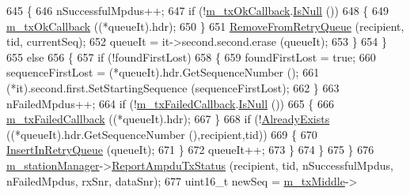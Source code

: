 \begin{DoxyCode}
645                         \{
646                           nSuccessfulMpdus++;
647                           \textcolor{keywordflow}{if} (!\hyperlink{classns3_1_1BlockAckManager_ace96f46b7c52c441becc70227b70d070}{m\_txOkCallback}.\hyperlink{classns3_1_1Callback_aa8e27826badbf37f84763f36f70d9b54}{IsNull} ())
648                             \{
649                               \hyperlink{classns3_1_1BlockAckManager_ace96f46b7c52c441becc70227b70d070}{m\_txOkCallback} ((*queueIt).hdr);
650                             \}
651                           \hyperlink{classns3_1_1BlockAckManager_aa7fc7ecdb5e0171b0e84bb39554f75e2}{RemoveFromRetryQueue} (recipient, tid, currentSeq);
652                           queueIt = it->second.second.erase (queueIt);
653                         \}
654                     \}
655                   \textcolor{keywordflow}{else}
656                     \{
657                       \textcolor{keywordflow}{if} (!foundFirstLost)
658                         \{
659                           foundFirstLost = \textcolor{keyword}{true};
660                           sequenceFirstLost = (*queueIt).hdr.GetSequenceNumber ();
661                           (*it).second.first.SetStartingSequence (sequenceFirstLost);
662                         \}
663                       nFailedMpdus++;
664                       \textcolor{keywordflow}{if} (!\hyperlink{classns3_1_1BlockAckManager_a58ccfd5da1b7e739b732699ddcc13530}{m\_txFailedCallback}.\hyperlink{classns3_1_1Callback_aa8e27826badbf37f84763f36f70d9b54}{IsNull} ())
665                         \{
666                           \hyperlink{classns3_1_1BlockAckManager_a58ccfd5da1b7e739b732699ddcc13530}{m\_txFailedCallback} ((*queueIt).hdr);
667                         \}
668                       \textcolor{keywordflow}{if} (!\hyperlink{classns3_1_1BlockAckManager_a36a1c566d4039034d22b9afead55c199}{AlreadyExists} ((*queueIt).hdr.GetSequenceNumber (),recipient,tid))
669                         \{
670                           \hyperlink{classns3_1_1BlockAckManager_aa09e2e2b119ed7a054a580971cf950e3}{InsertInRetryQueue} (queueIt);
671                         \}
672                       queueIt++;
673                     \}
674                 \}
675             \}
676           \hyperlink{classns3_1_1BlockAckManager_afb809abb11edae6179dc2f5b8c1f8ce5}{m\_stationManager}->\hyperlink{classns3_1_1WifiRemoteStationManager_a9630acb259fe192dfd7606fd459c9cdc}{ReportAmpduTxStatus} (recipient, tid, 
      nSuccessfulMpdus, nFailedMpdus, rxSnr, dataSnr);
677           uint16\_t newSeq = \hyperlink{classns3_1_1BlockAckManager_a3c78348cca01da647d813f90d2463a44}{m\_txMiddle}->

\end{DoxyCode}
